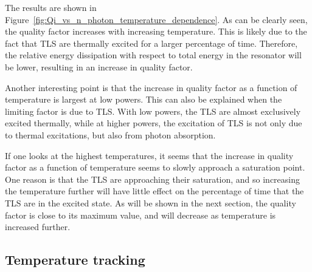 \documentclass[12pt]{report}
\begin{document}
The results are shown in Figure~\ref{fig:Qi_vs_n_photon_temperature_dependence}. As can be clearly seen, the quality factor increases with increasing temperature. This is likely due to the fact that TLS are thermally excited for a larger percentage of time. Therefore, the relative energy dissipation with respect to total energy in the resonator will be lower, resulting in an increase in quality factor.

Another interesting point is that the increase in quality factor as a function of temperature is largest at low powers. This can also be explained when the limiting factor is due to TLS. With low powers, the TLS are almost exclusively excited thermally, while at higher powers, the excitation of TLS is not only due to thermal excitations, but also from photon absorption.

If one looks at the highest temperatures, it seems that the increase in quality factor as a function of temperature seems to slowly approach a saturation point. One reason is that the TLS are approaching their saturation, and so increasing the temperature further will have little effect on the percentage of time that the TLS are in the excited state. As will be shown in the next section, the quality factor is close to its maximum value, and will decrease as temperature is increased further.



\subsection{Temperature tracking}
\label{resonator:results:temperature_tracking}
\end{document}
